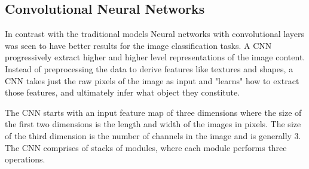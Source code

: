 \documentclass{book}
\begin{document}
\subsection{Convolutional Neural Networks}%
In contrast with the traditional models Neural networks with convolutional layers was seen to have better results for the image classification tasks. A CNN progressively extract higher and higher level representations of the image content. Instead of preprocessing the data to derive features like textures and shapes, a CNN takes just the raw pixels of the image as input and "learns" how to extract those features, and ultimately infer what object they constitute.

\label{sub:Convolutional Neural Networks}
The CNN starts with an input feature map of three dimensions where the size of the first two dimensions is the length and width of the images in pixels. The size of the third dimension is the number of channels in the image and is generally 3. The CNN comprises of stacks of modules, where each module performs three operations.
\end{document}
